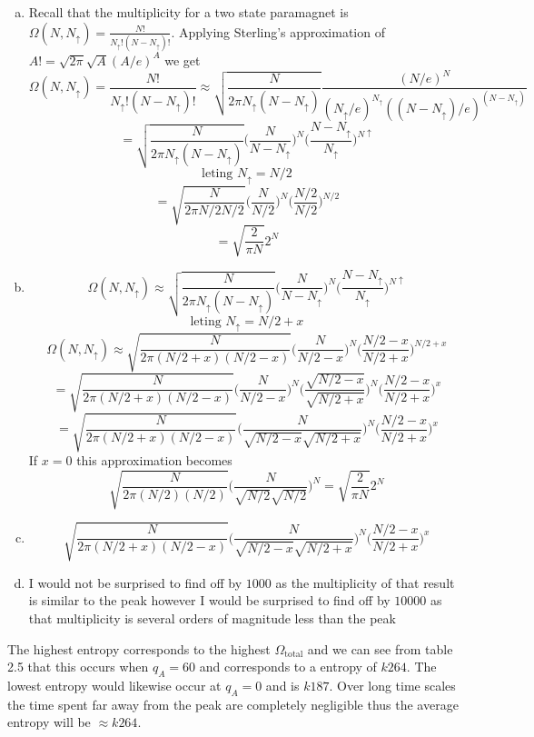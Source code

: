 \documentclass[12pt]{article}
\makeatletter
\theoremstyle{homework}
\newenvironment{exercise}[1]
{\def\@currentlabel{#1}\exercisecore}
{\endexercisecore}
\makeatother
\begin{document}
\begin{exercise}{2.24}
\begin{enumerate}[(a)]
\item
Recall that the multiplicity for a two state paramagnet is $\Omega(N,N_\uparrow )=\frac{N!}{N_\uparrow ! (N-N_\uparrow)!}$.    Applying Sterling's approximation of $A!=\sqrt{2\pi}\sqrt{A}(A/e)^A$ we get
$$\Omega(N,N_\uparrow )=\frac{N!}{N_\uparrow ! (N-N_\uparrow)!}\approx\sqrt{\frac{N}{2\pi N_\uparrow  (N-N_\uparrow)}} \frac{(N/e)^N}{(N_\uparrow/e)^{N_\uparrow} ((N-N_\uparrow)/e)^{(N-N_\uparrow)}}$$
$$=\sqrt{\frac{N}{2\pi N_\uparrow  (N-N_\uparrow)}}\biggr(\frac{N}{N-N_\uparrow}\biggr)^N \biggr(\frac{N-N_\uparrow}{N_\uparrow}\biggr)^{N\uparrow} $$
$$\text{leting }N_\uparrow=N/2$$
$$=\sqrt{\frac{N}{2\pi N/2  N/2}}\biggr(\frac{N}{N/2}\biggr)^N \biggr(\frac{N/2}{N/2}\biggr)^{N/2}$$
$$=\sqrt{\frac{2}{\pi N}}2^N$$
\item
$$\Omega(N,N_\uparrow )\approx\sqrt{\frac{N}{2\pi N_\uparrow  (N-N_\uparrow)}}\biggr(\frac{N}{N-N_\uparrow}\biggr)^N \biggr(\frac{N-N_\uparrow}{N_\uparrow}\biggr)^{N\uparrow} $$
$$\text{leting }N_\uparrow=N/2+x$$
$$\Omega(N,N_\uparrow )\approx\sqrt{\frac{N}{2\pi (N/2+x)  (N/2-x)}}\biggr(\frac{N}{N/2-x}\biggr)^N \biggr(\frac{N/2-x}{N/2+x}\biggr)^{N/2+x} $$
$$=\sqrt{\frac{N}{2\pi (N/2+x)  (N/2-x)}}\biggr(\frac{N}{N/2-x}\biggr)^N \biggr(\frac{\sqrt{N/2-x}}{\sqrt{N/2+x}}\biggr)^{N} \biggr(\frac{N/2-x}{N/2+x}\biggr)^{x} $$
$$=\sqrt{\frac{N}{2\pi (N/2+x)  (N/2-x)}}\biggr(\frac{N}{\sqrt{N/2-x}\sqrt{N/2+x}}\biggr)^N  \biggr(\frac{N/2-x}{N/2+x}\biggr)^{x} $$
If $x=0$ this approximation becomes
$$\sqrt{\frac{N}{2\pi (N/2)  (N/2)}}\biggr(\frac{N}{\sqrt{N/2}\sqrt{N/2}}\biggr)^N =\sqrt{\frac{2}{\pi N}}2^N$$
\item
$$\sqrt{\frac{N}{2\pi (N/2+x)  (N/2-x)}}\biggr(\frac{N}{\sqrt{N/2-x}\sqrt{N/2+x}}\biggr)^N  \biggr(\frac{N/2-x}{N/2+x}\biggr)^{x} $$
\item
I would not be surprised to find off by $1000$ as the multiplicity of that result is similar to the peak however I would be surprised to find off by $10000$ as that multiplicity is several orders of magnitude less than the peak
\end{enumerate}
\end{exercise}

\begin{exercise}{2.29}
The highest entropy corresponds to the highest $\Omega_{\text{total}}$ and we can see from table 2.5 that this occurs when $q_A=60$ and corresponds to a entropy of $k264$.  The lowest entropy would likewise occur at $q_A=0$ and is $k187$.  Over long time scales the time spent far away from the peak are completely negligible thus the average entropy will be $\approx k264$.
\end{exercise}
\end{document}
